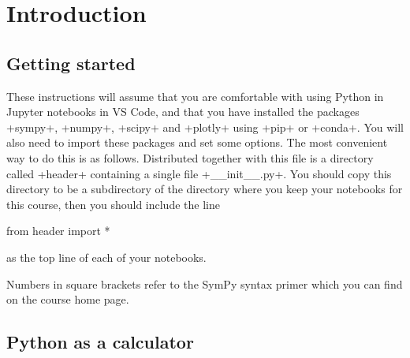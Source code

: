 \documentclass[a4paper,10pt]{amsbook}
\begin{document}
\chapter{Introduction}

\section{Getting started}

These instructions will assume that you are comfortable with using
Python in Jupyter notebooks in VS Code, and that you have installed 
the packages \pcode+sympy+, \pcode+numpy+, \pcode+scipy+ and
\pcode+plotly+ using \pcode+pip+ or \pcode+conda+.  You will also 
need to import these packages and set some options.  The most
convenient way to do this is as follows.  Distributed together with
this file is a directory called \pcode+header+ containing a single
file \pcode+__init__.py+.  You should copy this directory to be a
subdirectory of the directory where you keep your notebooks for this
course, then you should include the line 
\begin{pcodeblock}
 from header import *
\end{pcodeblock}
as the top line of each of your notebooks.

Numbers in square brackets refer to the SymPy syntax primer
which you can find on the course home page.

\section{Python as a calculator}
\end{document}
